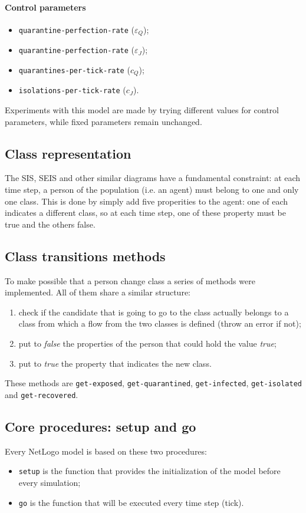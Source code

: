 \documentclass[12pt]{llncs}
\begin{document}
\paragraph{Control parameters}
\begin{itemize}
\item \texttt{quarantine-perfection-rate} ($\varepsilon_Q$);
\item \texttt{quarantine-perfection-rate} ($\varepsilon_J$);
\item \texttt{quarantines-per-tick-rate} ($c_Q$);
\item \texttt{isolations-per-tick-rate} ($c_J$).
\end{itemize}

Experiments with this model are made by trying different values for control parameters, while fixed parameters remain unchanged.

\subsection{Class representation}
The SIS, SEIS and other similar diagrams have a fundamental constraint: at each time step, a person of the population (i.e. an agent) must belong to one and only one class. This is done by simply add five properities to the agent: one of each indicates a different class, so at each time step, one of these property must be true and the others false.

\subsection{Class transitions methods}
To make possible that a person change class a series of methods were implemented. All of them share a similar structure:
\begin{enumerate}
\item check if the candidate that is going to go to the class actually belongs to a class from which a flow from the two classes is defined (throw an error if not);
\item put to \textit{false} the properties of the person that could hold the value \textit{true};
\item put to \textit{true} the property that indicates the new class.
\end{enumerate}
These methods are \texttt{get-exposed}, \texttt{get-quarantined}, \texttt{get-infected}, \texttt{get-isolated} and \texttt{get-recovered}.

\subsection{Core procedures: setup and go}
Every NetLogo model is based on these two procedures:
\begin{itemize}
\item \texttt{setup} is the function that provides the initialization of the model before every simulation;
\item \texttt{go} is the function that will be executed every time step (tick).
\end{itemize}
\end{document}
